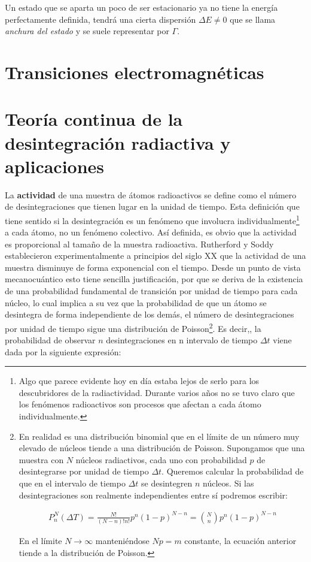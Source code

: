 
Un estado que se aparta un poco de ser estacionario ya no tiene la energía perfectamente definida, tendrá una cierta dispersión $\Delta E \neq 0$ que se llama \textit{anchura del estado} y se suele representar por $\Gamma$.


\section{Transiciones electromagnéticas}

\section{Teoría continua de la desintegración radiactiva y aplicaciones}

La \textbf{actividad} de una muestra de átomos radioactivos se define como el número de desintegraciones que tienen lugar en la unidad de tiempo. Esta definición que tiene sentido si la desintegración es un fenómeno que involucra individualmente\footnote{Algo que parece evidente hoy en día estaba lejos de serlo para los descubridores de la radiactividad. Durante varios años no se tuvo claro que los fenómenos radioactivos son procesos que afectan a cada átomo individualmente.} a cada átomo, no un fenómeno colectivo. Así definida, es obvio que la actividad es proporcional al tamaño de la muestra radioactiva. Rutherford y Soddy establecieron experimentalmente a principios del siglo XX que la actividad de una muestra disminuye de forma exponencial con el tiempo. Desde un punto de vista mecanocuántico esto tiene sencilla justificación, por que se deriva de la existencia de una probabilidad fundamental de transición por unidad de tiempo para cada núcleo, lo cual implica a su vez que la probabilidad de que un átomo se desintegra de forma independiente de los demás, el número de desintegraciones por unidad de tiempo sigue una distribución de Poisson\footnote{En realidad es una distribución binomial que en el límite de un número muy elevado de núcleos tiende a una distribución de Poisson. Supongamos que una muestra con $N$ núcleos radiactivos, cada uno con probabilidad $p$ de desintegrarse por unidad de tiempo $\Delta t$. Queremos calcular la probabilidad de que en el intervalo de tiempo $\Delta t$ se desintegren $n$ núcleos. Si las desintegraciones son realmente independientes entre sí podremos escribir:

\begin{eqnarray}
	P_n^N (\Delta T) = \frac{N!}{(N-n)!n!} p^n (1-p)^{N-n} = \binom{N}{n} p^n (1-p)^{N-n}
\end{eqnarray}

En el límite $N\rightarrow \infty$ manteniéndose $Np=m$ constante, la ecuación anterior tiende a la distribución de Poisson.}. Es decir,, la probabilidad de observar $n$ desintegraciones en n intervalo de tiempo $\Delta t$ viene dada por la siguiente expresión:

